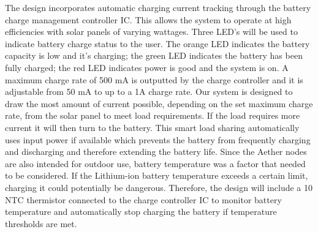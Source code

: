 The design incorporates automatic charging current tracking through the battery charge management controller IC. This allows the system to operate at high efficiencies with solar panels of varying wattages. Three LED's will be used to indicate battery charge status to the user. The orange LED indicates the battery capacity is low and it’s charging; the green LED indicates the battery has been fully charged; the red LED indicates power is good and the system is on. A maximum charge rate of 500 mA is outputted by the charge controller and it is adjustable from 50 mA to up to a 1A charge rate. Our system is designed to draw the most amount of current possible, depending on the set maximum charge rate, from the solar panel to meet load requirements. If the load requires more current it will then turn to the battery. This smart load sharing automatically uses input power if available which prevents the battery from frequently charging and discharging and therefore extending the battery life. Since the Aether nodes are also intended for outdoor use, battery temperature was a factor that needed to be considered. If the Lithium-ion battery temperature exceeds a certain limit, charging it could potentially be dangerous. Therefore, the design will include a 10 \kOhm NTC thermistor connected to the charge controller IC to monitor battery temperature and automatically stop charging the battery if temperature thresholds are met. 

